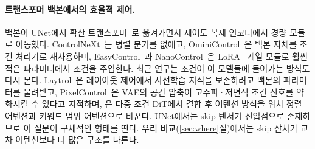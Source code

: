 \documentclass[10pt,twocolumn,a4paper]{article}
\begin{document}
\paragraph{트랜스포머 백본에서의 효율적 제어.} 백본이 UNet에서 확산
트랜스포머~\cite{peebles2022scalable,esser2024scaling}로 옮겨가면서 제어도 복제 인코더에서
경량 모듈로 이동했다. ControlNeXt~\cite{peng2024controlnext}는 병렬 분기를 없애고,
OminiControl~\cite{tan2024ominicontrol}은 백본 자체를 조건 처리기로 재사용하며,
EasyControl~\cite{zhang2025easycontrol}과 NanoControl~\cite{liu2025nanocontrol}은
LoRA~\cite{hu2021lora} 계열 모듈로 훨씬 적은 파라미터에서 조건을 주입한다. 최근 연구는
조건이 이 모델들에 들어가는 방식도 다시 본다. Laytrol~\cite{huang2025laytrol}은 레이아웃
제어에서 사전학습 지식을 보존하려고 백본의 파라미터를 물려받고,
PixelControl~\cite{lin2026pixelcontrol}은 VAE의 공간 압축이 고주파·저면적 조건 신호를
약화시킬 수 있다고 지적하며, \citet{zhou2026rethinking}은 다중 조건 DiT에서 결합 후
어텐션 방식을 위치 정렬 어텐션과 키워드 범위 어텐션으로 바꾼다. UNet에서는 skip 텐서가
진입점으로 존재하므로 이 질문이 구체적인 형태를 띤다. 우리 비교(\ref{sec:where}절)에서는
skip 잔차가 교차 어텐션보다 더 많은 구조를 나른다.
\end{document}
